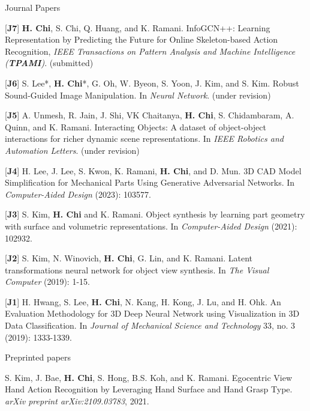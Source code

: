 \begin{cventries}
\vspace{-.5em}
\cvpub
{Journal Papers} %
{ %
\begin{cvitems}
    \item {[\textbf{J7}] \textbf{H. Chi}, S. Chi, Q. Huang, and K. Ramani. InfoGCN++: Learning Representation by Predicting the Future for Online Skeleton-based Action Recognition, \textit{IEEE Transactions on Pattern Analysis and Machine Intelligence (\textbf{TPAMI})}. (submitted) }
    \item {[\textbf{J6}] S. Lee*, \textbf{H. Chi}*, G. Oh, W. Byeon, S. Yoon, J. Kim, and S. Kim. Robust Sound-Guided Image Manipulation. In \textit{Neural Network}. (under revision)}
    \item {[\textbf{J5}] A. Unmesh,  R. Jain, J. Shi, VK Chaitanya, \textbf{H. Chi}, S. Chidambaram, A. Quinn, and K. Ramani. Interacting Objects: A dataset of object-object interactions for richer dynamic scene representations. In \textit{IEEE Robotics and Automation Letters}. (under revision)}
    \item {[\textbf{J4}] H. Lee, J. Lee, S. Kwon, K. Ramani, \textbf{H. Chi}, and D. Mun. 3D CAD Model Simplification for Mechanical Parts Using Generative Adversarial Networks. In \textit{Computer-Aided Design} (2023): 103577.}
    \item {[\textbf{J3}] S. Kim, \textbf{H. Chi} and K. Ramani. Object synthesis by learning part geometry with surface and volumetric representations. In \textit{Computer-Aided Design} (2021): 102932.}
    \item {[\textbf{J2}] S. Kim, N. Winovich, \textbf{H. Chi}, G. Lin, and K. Ramani. Latent transformations neural network for object view synthesis. In \textit{The Visual Computer} (2019): 1-15.}
    \item {[\textbf{J1}] H. Hwang, S. Lee, \textbf{H. Chi}, N. Kang, H. Kong, J. Lu, and H. Ohk. An Evaluation Methodology for 3D Deep Neural Network using Visualization in 3D Data Classification. In \textit{Journal of Mechanical Science and Technology} 33, no. 3 (2019): 1333-1339.}
\end{cvitems}
}

\vspace{-.5em}
\cvpub
{Preprinted papers} %
{
\begin{cvitems}
    \item {S. Kim, J. Bae, \textbf{H. Chi}, S. Hong, B.S. Koh, and K. Ramani. Egocentric View Hand Action Recognition by Leveraging Hand Surface and Hand Grasp Type. \textit{arXiv preprint arXiv:2109.03783}, 2021. }
\end{cvitems}
}




\end{cventries}
